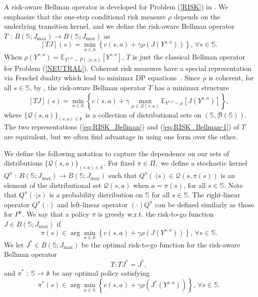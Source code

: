 \documentclass[12pt,technote,onecolumn]{IEEEtran}
\begin{document}
A risk-aware Bellman operator is developed for Problem (\ref{RISK})
in \cite[Theorem 4]{ruszczynski2010risk}. We emphasize that the one-step conditional risk measure $\rho$ depends on the underlying transition kernel, and we define the risk-aware Bellman operator $T\mbox{ : }B(\mathbb{S};J_{\max})\rightarrow B(\mathbb{S};J_{\max})$ as
\begin{equation}
\left[TJ\right]\left(s\right)=\min_{a\in\mathbb{A}}\left\{ c(s,a)+\gamma\rho\left(J\left(Y^{s,a}\right)\right)\right\},\,\forall s\in\mathbb{S}.\label{eq:RISK_Bellman}
\end{equation}
When $\rho(Y^{s,a})=\mathbb{E}_{Y^{s,a}\sim P(\cdot\vert s,a)}[Y^{s,a}]$,
$T$ is just the classical Bellman operator for Problem (\ref{NEUTRAL}).
Coherent risk measures have a special representation via Fenchel duality
\cite{Ruszczynski:2006uq} which lead to minimax DP
equations~\cite{ruszczynski2010risk}. Since $\rho$
is coherent, for all $s\in\mathbb{S}$, by \cite[Theorem 2.2]{Ruszczynski:2006uq}, the risk-aware
Bellman operator $T$ has a minimax structure
\begin{equation}
\left[TJ\right]\left(s\right)=\min_{a\in\mathbb{A}}\left\{ c(s,a)+\gamma\max_{\mu\in\mathcal{Q}\left(s,a\right)}\mathbb{E}_{Y^{s,a}\sim\mu}\left[J\left(Y^{s,a}\right)\right]\right\},\label{eq:RISK_Bellman-1}
\end{equation}
where $\{\mathcal{Q}(s,a)\} _{\left(s,a\right)\in\mathbb{K}}$
is a collection of distributional sets on $(\mathbb{S},\mathcal{B}(\mathbb{S}))$.
The two representations (\ref{eq:RISK_Bellman}) and (\ref{eq:RISK_Bellman-1})
of $T$ are equivalent, but we often find advantage in using one form
over the other.

We define the following notation to capture the dependence on our
sets of distributions $\{\mathcal{Q}(s,a)\}_{(s,a)\in\mathbb{K}}$.
For fixed $\pi\in\Pi,$ we define a stochastic kernel $Q^{\pi}\mbox{ : }B(\mathbb{S};J_{\max})\rightarrow B(\mathbb{S};J_{\max})$ such that $Q^{\pi}(\cdot\vert s)\in\mathcal{Q}(s,\pi(s))$
is an element of the distributional set $\mathcal{Q}(s,a)$
when $a=\pi(s)$, for all $s\in\mathbb{S}$. Note that
$Q^{\pi}(\cdot\vert s)$ is a probability distribution
on $\mathbb{S}$ for all $s\in\mathbb{S}$. The right-linear operator
$Q^{\pi}(\cdot)$ and left-linear operator $(\cdot)Q^{\pi}$
can be defined similarly as those for $P^{\pi}.$ We
say that a policy $\pi$ is greedy w.r.t. the risk-to-go function
$J\in B(\mathbb{S};J_{\max})$ if
\[
\pi\left(s\right)\in\arg\min_{a\in\mathbb{A}}\left\{ c(s,a)+\gamma\rho\left(J\left(Y^{s,a}\right)\right)\right\},\,\forall s\in\mathbb{S}.
\]
We let $J^{*}\in B\left(\mathbb{S};J_{\max}\right)$ be the optimal
risk-to-go function for the risk-aware Bellman operator 
$$T:TJ^{*}=J^{*},$$ 
and $\pi^{*}\mbox{ : }\mathbb{S}\rightarrow\mathbb{A}$ be any optimal
policy satisfying
\[
\pi^{*}\left(s\right)\in\arg\min_{a\in\mathbb{A}}\left\{ c(s,a)+\gamma\rho\left(J^*\left(Y^{s,a}\right)\right)\right\},\,\forall s\in\mathbb{S}.
\]
\end{document}
